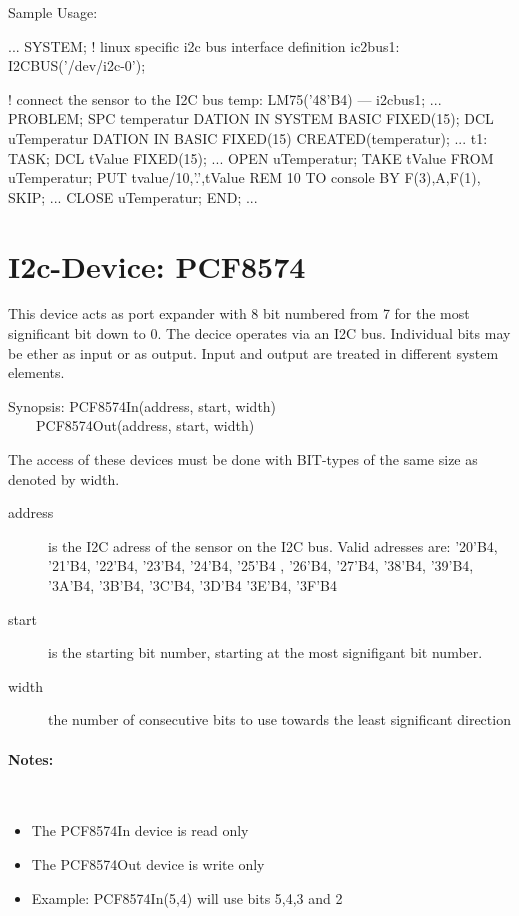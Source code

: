 Sample Usage:
\begin{PEARLCode}
...
SYSTEM;
   ! linux specific i2c bus interface definition
   ic2bus1: I2CBUS('/dev/i2c-0');

   ! connect the sensor to the I2C bus
   temp: LM75('48'B4) --- i2cbus1;
...
PROBLEM;
   SPC temperatur DATION IN SYSTEM BASIC FIXED(15);
   DCL uTemperatur DATION IN BASIC FIXED(15) CREATED(temperatur);
...
t1: TASK;
   DCL tValue FIXED(15);
...
   OPEN uTemperatur;
   TAKE tValue FROM uTemperatur;
   PUT tvalue/10,'.',tValue REM 10 TO console BY F(3),A,F(1), SKIP;
...
   CLOSE uTemperatur;
END;
...
\end{PEARLCode}

\section{I2c-Device: PCF8574}
This device acts as port expander with 8 bit numbered from 7
for the most significant bit down to 0.
The decice operates via an I2C bus. 
Individual bits may be ether as input or as output.
Input and output are treated in different system elements.

Synopsis: PCF8574In(address, start, width) \\
\ \ \ \ PCF8574Out(address, start, width)

The access of these devices must be done with BIT-types of the same size
as denoted by width.

\begin{description}
\item[address] is the I2C adress of the sensor on the I2C bus.
   Valid adresses are: '20'B4, '21'B4, '22'B4, '23'B4,
            '24'B4, '25'B4 , '26'B4, '27'B4,
            '38'B4, '39'B4, '3A'B4, '3B'B4, '3C'B4, '3D'B4 '3E'B4, '3F'B4
\item[start] is the starting bit number, starting at the most signifigant bit 
    number. 
\item[width] the number of consecutive bits to use
      towards the least significant direction
\end{description}

\paragraph{Notes:}\ 
\begin{itemize}
\item The PCF8574In device is read only
\item The PCF8574Out device is write only
\item Example: PCF8574In(5,4) will use bits 5,4,3 and 2 
\end{itemize}

